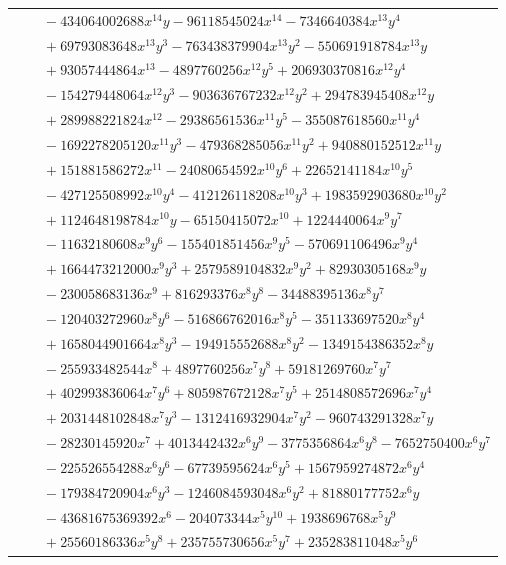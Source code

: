 \documentclass[11pt]{article}
\begin{document}
\begin{longtable}{@{}ll@{}}
 & $\quad -434064002688x^{14}y-96118545024x^{14}-7346640384x^{13}y^{4}$\\
 & $\quad +69793083648x^{13}y^{3}-763438379904x^{13}y^{2}-550691918784x^{13}y$\\
 & $\quad +93057444864x^{13}-4897760256x^{12}y^{5}+206930370816x^{12}y^{4}$\\
 & $\quad -154279448064x^{12}y^{3}-903636767232x^{12}y^{2}+294783945408x^{12}y$\\
 & $\quad +289988221824x^{12}-29386561536x^{11}y^{5}-355087618560x^{11}y^{4}$\\
 & $\quad -1692278205120x^{11}y^{3}-479368285056x^{11}y^{2}+940880152512x^{11}y$\\
 & $\quad +151881586272x^{11}-24080654592x^{10}y^{6}+22652141184x^{10}y^{5}$\\
 & $\quad -427125508992x^{10}y^{4}-412126118208x^{10}y^{3}+1983592903680x^{10}y^{2}$\\
 & $\quad +1124648198784x^{10}y-65150415072x^{10}+1224440064x^{9}y^{7}$\\
 & $\quad -11632180608x^{9}y^{6}-155401851456x^{9}y^{5}-570691106496x^{9}y^{4}$\\
 & $\quad +1664473212000x^{9}y^{3}+2579589104832x^{9}y^{2}+82930305168x^{9}y$\\
 & $\quad -230058683136x^{9}+816293376x^{8}y^{8}-34488395136x^{8}y^{7}$\\
 & $\quad -120403272960x^{8}y^{6}-516866762016x^{8}y^{5}-351133697520x^{8}y^{4}$\\
 & $\quad +1658044901664x^{8}y^{3}-194915552688x^{8}y^{2}-1349154386352x^{8}y$\\
 & $\quad -255933482544x^{8}+4897760256x^{7}y^{8}+59181269760x^{7}y^{7}$\\
 & $\quad +402993836064x^{7}y^{6}+805987672128x^{7}y^{5}+2514808572696x^{7}y^{4}$\\
 & $\quad +2031448102848x^{7}y^{3}-1312416932904x^{7}y^{2}-960743291328x^{7}y$\\
 & $\quad -28230145920x^{7}+4013442432x^{6}y^{9}-3775356864x^{6}y^{8}-7652750400x^{6}y^{7}$\\
 & $\quad -225526554288x^{6}y^{6}-67739595624x^{6}y^{5}+1567959274872x^{6}y^{4}$\\
 & $\quad -179384720904x^{6}y^{3}-1246084593048x^{6}y^{2}+81880177752x^{6}y$\\
 & $\quad -43681675369392x^{6}-204073344x^{5}y^{10}+1938696768x^{5}y^{9}$\\
 & $\quad +25560186336x^{5}y^{8}+235755730656x^{5}y^{7}+235283811048x^{5}y^{6}$\\

\end{longtable}
\end{document}
